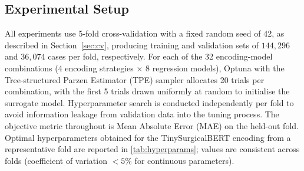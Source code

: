 \subsection{Experimental Setup}
\label{sec:exp_setup}

All experiments use 5-fold cross-validation with a fixed random seed of 42, as described in Section~\ref{sec:cv}, producing training and validation sets of $144{,}296$ and $36{,}074$ cases per fold, respectively. For each of the 32 encoding-model combinations (4 encoding strategies $\times$ 8 regression models), Optuna with the Tree-structured Parzen Estimator (TPE) sampler allocates 20 trials per combination, with the first 5 trials drawn uniformly at random to initialise the surrogate model. Hyperparameter search is conducted independently per fold to avoid information leakage from validation data into the tuning process. The objective metric throughout is Mean Absolute Error (MAE) on the held-out fold. Optimal hyperparameters obtained for the TinySurgicalBERT encoding from a representative fold are reported in \cref{tab:hyperparams}; values are consistent across folds (coefficient of variation $< 5\%$ for continuous parameters).

